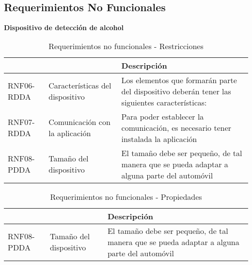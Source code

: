 \subsection{Requerimientos No Funcionales} 
  
\textbf{Dispositivo de detección de alcohol}
\begin{center}
\begin{table}[!htb]
\centering
\begin{tabular}{|p{4cm}|p{4cm}|p{5cm}|}
    \hline
    \centering {\bfseries }  & \centering {\bfseries Nombre} & {\bfseries Descripción} \\ \hline
    \centering RNF06-RDDA & \centering Características del dispositivo & Los elementos que formarán parte del dispositivo deberán tener las siguientes características: \\ \hline
    \centering RNF07-RDDA & \centering Comunicación con la aplicación & Para poder establecer la comunicación, es necesario tener instalada la aplicación \\ \hline
    \centering RNF08-PDDA & \centering Tamaño del dispositivo & El tamaño debe ser pequeño, de tal manera que se pueda adaptar a alguna parte del automóvil \\ \hline
\end{tabular}
\caption{Requerimientos no funcionales - Restricciones}
\label{tabla:pobconlimsincolo}
\end{table}
\end{center}

\begin{center}
\begin{table}[!htb]
\centering
\begin{tabular}{|p{4cm}|p{4cm}|p{5cm}|}
    \hline
    \centering {\bfseries }  & \centering {\bfseries Nombre} & {\bfseries Descripción} \\ \hline
    \centering RNF08-PDDA & \centering Tamaño del dispositivo & El tamaño debe ser pequeño, de tal manera que se pueda adaptar a alguna parte del automóvil \\ \hline
\end{tabular}
\caption{Requerimientos no funcionales - Propiedades}
\label{tabla:pobconlimsincolo}
\end{table}
\end{center}

